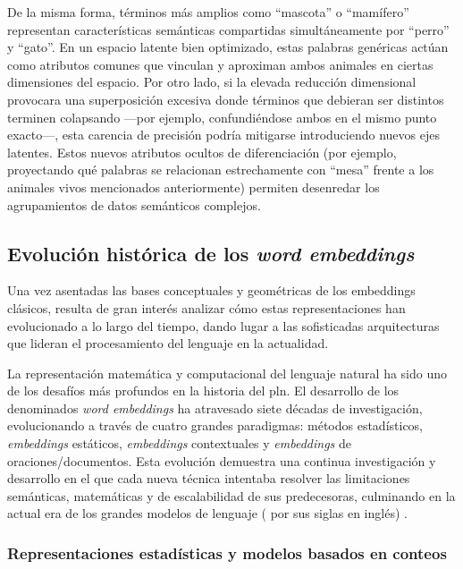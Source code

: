 De la misma forma, términos más amplios como ``mascota'' o ``mamífero'' representan características semánticas compartidas simultáneamente por ``perro'' y ``gato''. En un espacio latente bien optimizado, estas palabras genéricas actúan como atributos comunes que vinculan y aproximan ambos animales en ciertas dimensiones del espacio. Por otro lado, si la elevada reducción dimensional provocara una superposición excesiva donde términos que debieran ser distintos terminen colapsando —por ejemplo, confundiéndose ambos en el mismo punto exacto—, esta carencia de precisión podría mitigarse introduciendo nuevos ejes latentes. Estos nuevos atributos ocultos de diferenciación (por ejemplo, proyectando qué palabras se relacionan estrechamente con ``mesa'' frente a los animales vivos mencionados anteriormente) permiten desenredar los agrupamientos de datos semánticos complejos.


\subsection{Evolución histórica de los \textit{word embeddings}}
\label{subsec:evolucion_historica}

Una vez asentadas las bases conceptuales y geométricas de los embeddings clásicos, resulta de gran interés analizar cómo estas representaciones han evolucionado a lo largo del tiempo, dando lugar a las sofisticadas arquitecturas que lideran el procesamiento del lenguaje en la actualidad.

La representación matemática y computacional del lenguaje natural ha sido uno de los desafíos más profundos en la historia del \gls{pln}. El desarrollo de los denominados \textit{word embeddings} ha atravesado siete décadas de investigación, evolucionando a través de cuatro grandes paradigmas: métodos estadísticos, \textit{embeddings} estáticos, \textit{embeddings} contextuales y \textit{embeddings} de oraciones/documentos. Esta evolución demuestra una continua investigación y desarrollo en el que cada nueva técnica intentaba resolver las limitaciones semánticas, matemáticas y de escalabilidad de sus predecesoras, culminando en la actual era de los grandes modelos de lenguaje ( por sus siglas en inglés) \cite{nguyen_tracing_2026}.

\subsubsection{Representaciones estadísticas y modelos basados en conteos}

